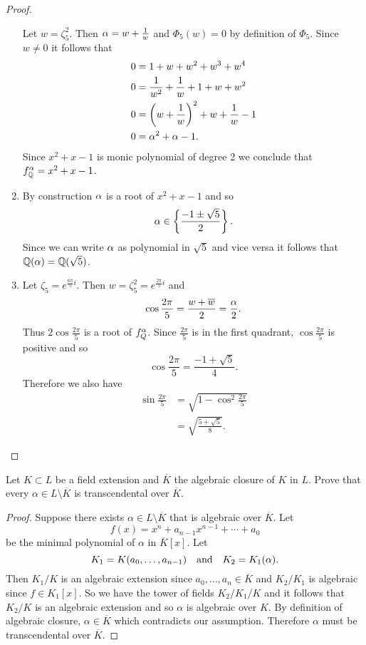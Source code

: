 \begin{proof}
\begin{enumerate}
            Let $w=\zeta_5^2$. Then $\alpha=w+\frac1w$ and $\Phi_5(w)=0$ by definition of $\Phi_5$. Since $w\neq0$ it follows that
            \begin{align*}
                0&=1+w+w^2+w^3+w^4\\
                0&=\frac{1}{w^2}+\frac1w+1+w+w^2\\
                0&=\left(w+\frac1w\right)^2+w+\dfrac1w-1\\
                0&=\alpha^2+\alpha-1.
            \end{align*}
            Since $x^2+x-1$ is monic polynomial of degree 2 we conclude that $f^\alpha_{\mathbb{Q}}=x^2+x-1$.
        \item By construction $\alpha$ is a root of $x^2+x-1$ and so
            $$\alpha\in\left\{\frac{-1\pm\sqrt{5}}{2}\right\}.$$
            Since we can write $\alpha$ as polynomial in $\sqrt{5}$ and vice versa it follows that $\mathbb{Q}(\alpha)=\mathbb{Q}(\sqrt{5})$.
        \item Let $\zeta_5=e^{\frac{6\pi}{5}i}$. Then $w=\zeta_5^2=e^{\frac{2\pi}{5}i}$ and 
            $$\cos\frac{2\pi}{5}=\frac{w+\overline{w}}{2}=\frac{\alpha}{2}.$$
            Thus $2\cos\frac{2\pi}{5}$ is a root of $f^\alpha_Q$. Since $\frac{2\pi}{5}$ is in the first quadrant, $\cos\frac{2\pi}{5}$ is positive and so
            $$\cos\frac{2\pi}{5}=\frac{-1+\sqrt{5}}{4}.$$
            Therefore we also have
            \begin{align*}
                \sin\frac{2\pi}{5}&=\sqrt{1-\cos^2\frac{2\pi}{5}}\\
                &=\sqrt{\frac{5+\sqrt{5}}{8}}.
            \end{align*}
        \end{enumerate}
    \end{proof}
    \begin{ex}{21.32}
        Let $K\subset L$ be a field extension and $\overline{K}$ the algebraic closure of $K$ in $L$. 
        Prove that every $\alpha\in L\setminus\overline{K}$ is transcendental over $\overline{K}$.
    \end{ex}
    \begin{proof}
        Suppose there exists $\alpha\in L\setminus\overline{K}$ that is algebraic over $\overline{K}$.
        Let
        $$f(x)=x^n+a_{n-1}x^{n-1}+\cdots+a_0$$
        be the minimal polynomial of $\alpha$ in $\overline{K}[x]$. Let 
        $$K_1=K(a_0,\dots,a_{n-1})\quad\text{and}\quad K_2=K_1(\alpha).$$
        Then $K_1/K$ is an algebraic extension since $a_0,\dots,a_n\in\overline{K}$ and $K_2/K_1$ is algebraic since $f\in K_1[x]$.
        So we have the tower of fields $K_2/K_1/K$  and it follows that $K_2/K$ is an algebraic extension and so $\alpha$ is algebraic over $K$.
        By definition of algebraic closure, $\alpha\in\overline{K}$ which contradicts our assumption. 
        Therefore $\alpha$ must be transcendental over $\overline{K}$.
    \end{proof}

